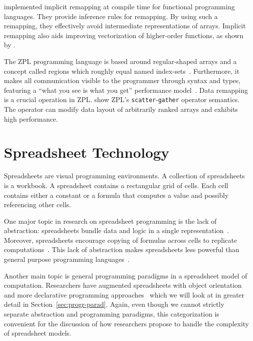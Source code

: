 \documentclass[a4paper]{article}
\begin{document}
\citet{Walinsky:1990:FPL:91556.91610} implemented implicit remapping
at compile time for functional programming languages. They provide
inference rules for remapping. By using such a remapping, they
effectively avoid intermediate representations of arrays. Implicit
remapping also aids improving vectorization of higher-order functions,
as shown by \citet{Sinkarovs:2013:SDL:2502323.2502332}.

The ZPL programming language is based around regular-shaped arrays and
a concept called regions which roughly equal named
index-sets~\cite{Chamberlain1999Regions}. Furthermore, it makes all
communication visible to the programmer through syntax and types,
featuring a ``what you see is what you get'' performance
model~\cite{Chamberlain1998ZPLs}. Data remapping is a crucial
operation in ZPL.\@ \citet{Deitz:2003:DIP:781498.781526} show ZPL's
\texttt{scatter}-\texttt{gather} operator semantics. The operator can
modify data layout of arbitrarily ranked arrays and exhibits high
performance.

\section{Spreadsheet Technology}
\label{sec:spreadsheet-end-user-dev}

Spreadsheets are visual programming environments. A collection of
spreadsheets is a workbook. A spreadsheet contains a rectangular grid
of cells. Each cell contains either a constant or a formula that
computes a value and possibly referencing other cells.

One major topic in research on spreadsheet programming is the lack of
abstraction: spreadsheets bundle data and logic in a single
representation~\cite{Isakowitz:1995:TLT:195705.195708}. Moreover,
spreadsheets encourage copying of formulas across cells to replicate
computations~\cite{1173080, Benfield:2009:FFD:1668113.1668121}. This
lack of abstraction makes spreadsheets less powerful than general
purpose programming languages~\cite{Miller:2015:SPB:2814189.2814201}.

Another main topic is general programming paradigms in a spreadsheet
model of computation. Researchers have augmented spreadsheets with
object orientation~\cite{Benfield:2009:FFD:1668113.1668121} and more
declarative programming
approaches~\cite{Stadelmann:1993:SBC:168642.168664,
  Singh:2016:TSD:2837614.2837668} which we will look at in greater
detail in Section~\ref{sec:progr-parad}. Again, even though we cannot
strictly separate abstraction and programming paradigms, this
categorization is convenient for the discussion of how researchers
propose to handle the complexity of spreadsheet models.
\end{document}
